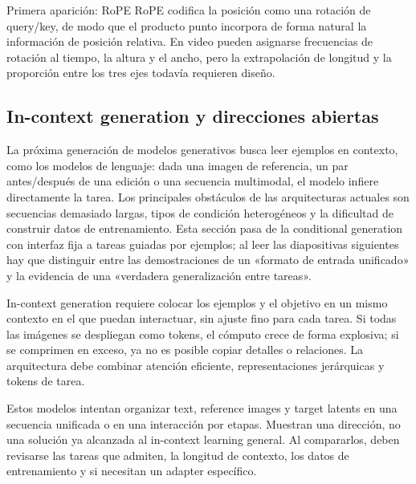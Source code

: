 \begin{knowledgebox}{Primera aparición: RoPE}
RoPE codifica la posición como una rotación de query/key, de modo que el producto punto incorpora de forma natural la información de posición relativa. En video pueden asignarse frecuencias de rotación al tiempo, la altura y el ancho, pero la extrapolación de longitud y la proporción entre los tres ejes todavía requieren diseño.
\end{knowledgebox}

\subsection{In-context generation y direcciones abiertas}

La próxima generación de modelos generativos busca leer ejemplos en contexto, como los modelos de lenguaje: dada una imagen de referencia, un par antes/después de una edición o una secuencia multimodal, el modelo infiere directamente la tarea. Los principales obstáculos de las arquitecturas actuales son secuencias demasiado largas, tipos de condición heterogéneos y la dificultad de construir datos de entrenamiento. Esta sección pasa de la conditional generation con interfaz fija a tareas guiadas por ejemplos; al leer las diapositivas siguientes hay que distinguir entre las demostraciones de un «formato de entrada unificado» y la evidencia de una «verdadera generalización entre tareas».


In-context generation requiere colocar los ejemplos y el objetivo en un mismo contexto en el que puedan interactuar, sin ajuste fino para cada tarea. Si todas las imágenes se despliegan como tokens, el cómputo crece de forma explosiva; si se comprimen en exceso, ya no es posible copiar detalles o relaciones. La arquitectura debe combinar atención eficiente, representaciones jerárquicas y tokens de tarea.


Estos modelos intentan organizar text, reference images y target latents en una secuencia unificada o en una interacción por etapas. Muestran una dirección, no una solución ya alcanzada al in-context learning general. Al compararlos, deben revisarse las tareas que admiten, la longitud de contexto, los datos de entrenamiento y si necesitan un adapter específico.

